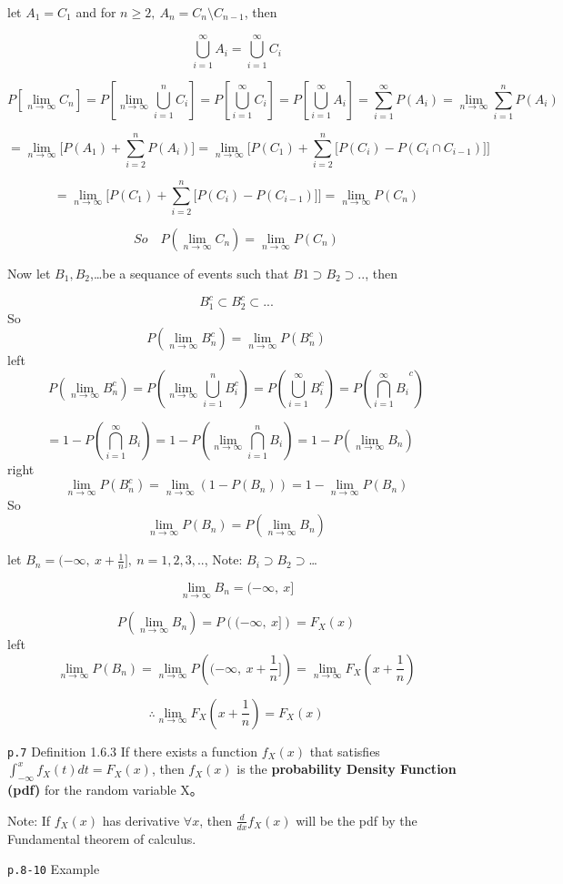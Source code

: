 \documentclass[]{tufte-book}
\begin{document}
let \(A_1=C_1\) and for \(n\ge2,\ A_n=C_n\setminus C_{n-1}\), then

\[\bigcup_{i=1}^\infty A_i=\bigcup_{i=1}^\infty C_i\]

\[P[\lim_{n\to\infty}C_n]=P[\lim_{n\to\infty}\bigcup_{i=1}^nC_i]=P[\bigcup_{i=1}^{\infty}C_i]=P[\bigcup_{i=1}^{\infty}A_i]=\sum_{i=1}^{\infty}P(A_i)=\lim_{n\to\infty}\sum_{i=1}^nP(A_i)\]

\[=\lim_{n\to\infty}\Big[P(A_1)+\sum_{i=2}^nP(A_i)\Big]=\lim_{n\to\infty}\Bigg[P(C_1)+\sum_{i=2}^n\Big[P(C_i)-P(C_i\cap C_{i-1})\Big]\Bigg]\]

\[=\lim_{n\to\infty}\Bigg[P(C_1)+\sum_{i=2}^n\Big[P(C_i)-P(C_{i-1})\Big]\Bigg]=\lim_{n\to\infty}P(C_n)\]

\[So\quad P(\lim_{n\to\infty}C_n)=\lim_{n\to\infty}P(C_n)\]

Now let \(B_1,B_2\),\ldots{}be a sequance of events such that
\(B1\supset B_2\supset..\), then

\[B_1^c\subset B_2^c\subset...\] So
\[P(\lim_{n\to\infty}B_n^c)=\lim_{n\to\infty}P(B_n^c)\] left
\[P(\lim_{n\to\infty}B_n^c)=P\left(\lim_{n\to\infty}\bigcup_{i=1}^nB_i^c\right)=P\left(\bigcup_{i=1}^{\infty}B_i^c\right)=P\left({\bigcap_{i=1}^{\infty}B_i}^c\right)\]

\[=1-P\left(\bigcap_{i=1}^{\infty}B_i\right)=1-P\left(\lim_{n\to\infty}\bigcap_{i=1}^nB_i\right)=1-P\left(\lim_{n\to\infty}B_n\right)\quad \]
right
\[\lim_{n\to\infty}P(B_n^c)=\lim_{n\to\infty}(1-P(B_n))=1-\lim_{n\to\infty}P(B_n)\]
So \[\lim_{n\to\infty}P(B_n)=P(\lim_{n\to\infty}B_n)\]

let \(B_n=(-\infty,\ x+\frac1n],\ n=1,2,3,..\), Note:
\(B_i\supset B_2\supset\)\ldots{}

\[\lim_{n\to\infty}B_n=(-\infty,\ x]\]

\[P\left(\lim_{n\to\infty}B_n\right)=P\left((-\infty,\ x]\right)=F_X(x)\]
left
\[\lim_{n\to\infty}P(B_n)=\lim_{n\to\infty}P\left((-\infty,\ x+\frac1n]\right)=\lim_{n\to\infty}F_X(x+\frac1n)\]

\[\therefore \lim_{n\to\infty}F_X(x+\frac1n)=F_X(x)\]

\texttt{p.7} Definition 1.6.3 If there exists a function \(f_X(x)\) that
satisfies \(\int_{-\infty}^xf_X(t)dt=F_X(x)\), then \(f_X(x)\) is the
\textbf{probability Density Function (pdf)} for the random variable X。

Note: If \(f_X(x)\) has derivative \(\forall x\), then
\(\frac{d}{dx}f_X(x)\) will be the pdf by the Fundamental theorem of
calculus.

\texttt{p.8-10} Example
\end{document}
